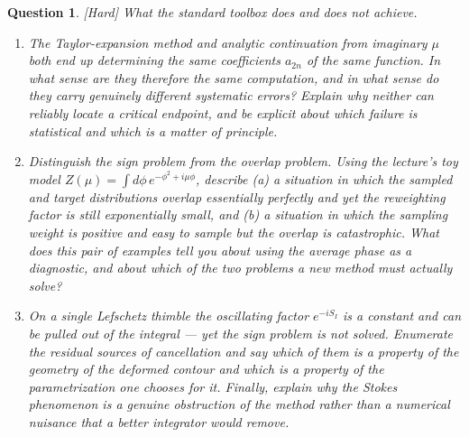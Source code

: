 \documentclass[11pt]{article}
\newcommand{\diff}[1]{\textcolor{blue!60!black}{\footnotesize\textsf{[#1]}}\quad}
\newtheorem{question}{Question}
\begin{document}
\begin{question}
\diff{Hard} What the standard toolbox does and does not achieve.
\begin{enumerate}[label=(\roman*), leftmargin=*]
  \item The Taylor-expansion method and analytic continuation from imaginary $\mu$ both end up determining the same coefficients $a_{2n}$ of the same function. In what sense are they therefore the same computation, and in what sense do they carry genuinely different systematic errors? Explain why neither can reliably locate a critical endpoint, and be explicit about which failure is statistical and which is a matter of principle.
  \item Distinguish the \emph{sign problem} from the \emph{overlap problem}. Using the lecture's toy model $Z(\mu) = \int d\phi\, e^{-\phi^2 + i\mu\phi}$, describe (a) a situation in which the sampled and target distributions overlap essentially perfectly and yet the reweighting factor is still exponentially small, and (b) a situation in which the sampling weight is positive and easy to sample but the overlap is catastrophic. What does this pair of examples tell you about using the average phase as a diagnostic, and about which of the two problems a new method must actually solve?
  \item On a single Lefschetz thimble the oscillating factor $e^{-iS_I}$ is a constant and can be pulled out of the integral --- yet the sign problem is not solved. Enumerate the residual sources of cancellation and say which of them is a property of the \emph{geometry} of the deformed contour and which is a property of the \emph{parametrization} one chooses for it. Finally, explain why the Stokes phenomenon is a genuine obstruction of the method rather than a numerical nuisance that a better integrator would remove.
\end{enumerate}
\end{question}
\end{document}
